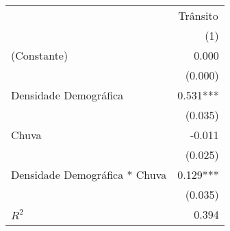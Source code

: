 \begin{tabular}{lr}
\toprule
                              & \multicolumn{1}{c}{Trânsito} \\ 
\cmidrule(lr){2-2} 
                              &                          (1) \\ 
\midrule
(Constante)                   &                        0.000 \\ 
                              &                      (0.000) \\ 
Densidade Demográfica         &                     0.531*** \\ 
                              &                      (0.035) \\ 
Chuva                         &                       -0.011 \\ 
                              &                      (0.025) \\ 
Densidade Demográfica * Chuva &                     0.129*** \\ 
                              &                      (0.035) \\ 
\midrule
$R^2$                         &                        0.394 \\ 
\bottomrule
\end{tabular}
